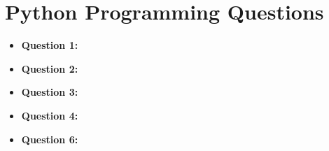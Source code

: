 \documentclass[12pt]{article}
\begin{document}
\section{Python Programming Questions}


\begin{itemize} 
  \item \textbf{Question 1: }
  \item \textbf{Question 2: }
  \item \textbf{Question 3: }
  \item \textbf{Question 4: }
  \item \textbf{Question 6: }
\end{itemize}
\end{document}
